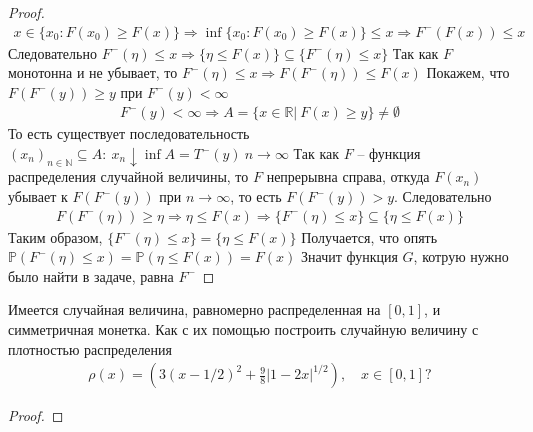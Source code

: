 \begin{proof}
\begin{gather*}
            x \in \{x_{0}: F(x_{0}) \geqslant F(x)\} \Rightarrow \inf \{x_{0}: F(x_{0}) \geqslant F(x)\} \leqslant x \Rightarrow
            F^{-}(F(x)) \leqslant x
        \end{gather*}
        Следовательно $F^{-}(\eta) \leqslant x \Rightarrow \{\eta \leqslant F(x)\} \subseteq \{F^{-}(\eta) \leqslant x\}$
        Так как $F$ монотонна и не убывает, то $F^{-}(\eta) \leqslant x \Rightarrow F(F^{-}(\eta)) \leqslant F(x)$
        Покажем, что $F(F^{-}(y)) \geqslant y$ при $F^{-}(y) < \infty$
        \begin{gather*}
            F^{-}(y) < \infty
            \Rightarrow
            A = \{x \in \mathbb{R}|\ F(x) \geqslant y\} \ne \emptyset
        \end{gather*}
        То есть существует последовательность $(x_n)_{n \in \mathbb{N}} \subseteq A:\ x_n \downarrow \inf A = T^{-}(y)\ n \to \infty$
        Так как $F$ -- функция распределения случайной величины, то $F$ непрерывна справа, откуда $F(x_n)$ убывает к $F(F^{-}(y))$ при $n \to \infty$, то есть $F(F^{-}(y)) > y$.
        Следовательно
        \begin{gather*}
            F(F^{-}(\eta)) \geqslant \eta
            \Rightarrow
            \eta \leqslant F(x)
            \Rightarrow
            \{F^{-}(\eta) \leqslant x\} \subseteq \{\eta \leqslant F(x)\}
        \end{gather*}
        Таким образом, $\{F^{-}(\eta) \leqslant x\} = \{\eta \leqslant F(x)\}$
        Получается, что опять
        $\mathbb{P}(F^{-}(\eta) \leqslant x) = \mathbb{P}(\eta \leqslant F(x)) = F(x)$
        Значит функция $G$, котрую нужно было найти в задаче, равна $F^{-}$
    \end{proof}
\vskip 0.6in



    \begin{prob}
        Имеется случайная величина, равномерно распределенная на $[0,1]$, и симметричная монетка. Как с их помощью построить случайную величину с плотностью распределения
        \begin{gather*}
            \rho(x)=\left(3(x-1 / 2)^{2}+\frac{9}{8}|1-2 x|^{1 / 2}\right), \quad x \in[0,1] ?
        \end{gather*}
    \end{prob}
    \begin{proof}
    \end{proof}
\vskip 0.6in



